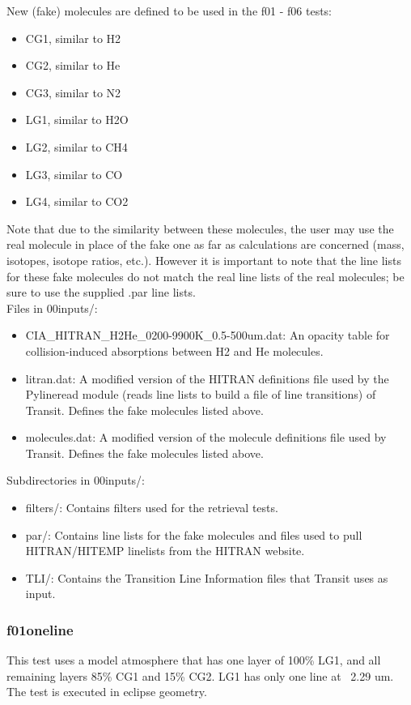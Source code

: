 \documentclass[letterpaper, 12pt]{article}
\begin{document}
New (fake) molecules are defined to be used in the f01 - f06 tests:
\begin{itemize} \itemsep0pt
  \item CG1, similar to H2
  \item CG2, similar to He
  \item CG3, similar to N2
  \item LG1, similar to H2O
  \item LG2, similar to CH4
  \item LG3, similar to CO
  \item LG4, similar to CO2
\end{itemize}
Note that due to the similarity between these molecules, the user may use 
the real molecule in place of the fake one as far as calculations are 
concerned (mass, isotopes, isotope ratios, etc.). However it is important to 
note that the line lists for these fake molecules do not match the real line 
lists of the real molecules; be sure to use the supplied .par line lists.\\

Files in 00inputs/:
\begin{itemize} \itemsep0pt
  \item CIA{\_}HITRAN{\_}H2He{\_}0200-9900K{\_}0.5-500um.dat: An opacity table for collision-induced absorptions between H2 and He molecules.
  \item litran.dat: A modified version of the HITRAN definitions file used by 
        the Pylineread module (reads line lists to build a file of line 
        transitions) of Transit. Defines the fake molecules listed above.
  \item molecules.dat: A modified version of the molecule definitions file 
        used by Transit. Defines the fake molecules listed above.
\end{itemize}

Subdirectories in 00inputs/:
\begin{itemize} \itemsep0pt
  \item filters/: Contains filters used for the retrieval tests.
  \item par/: Contains line lists for the fake molecules and files used to pull 
        HITRAN/HITEMP linelists from the HITRAN website.
  \item TLI/: Contains the Transition Line Information files that Transit uses 
        as input.
\end{itemize}

\subsubsection{f01oneline}
\label{sec:oneline}
This test uses a model atmosphere that has one layer of 100\% LG1, and all 
remaining layers 85\% CG1 and 15\% CG2. LG1 has only one line at ~2.29 um. 
The test is executed in eclipse geometry.\\
\end{document}
